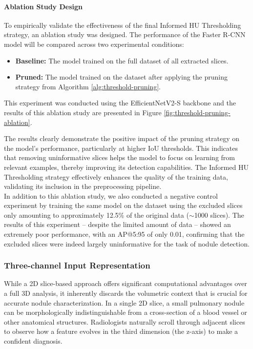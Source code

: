 \paragraph{Ablation Study Design}
To empirically validate the effectiveness of the final Informed HU Thresholding strategy, an ablation study was designed. The performance of the Faster R-CNN model will be compared across two experimental conditions:
\begin{itemize}
    \item \textbf{Baseline:} The model trained on the full dataset of all extracted slices.
    \item \textbf{Pruned:} The model trained on the dataset after applying the pruning strategy from Algorithm \ref{alg:threshold-pruning}.
\end{itemize}
This experiment was conducted using the EfficientNetV2-S backbone and the results of this ablation study are presented in Figure \ref{fig:threshold-pruning-ablation}.



The results clearly demonstrate the positive impact of the pruning strategy on the model's performance, particularly at higher IoU thresholds. This indicates that removing uninformative slices helps the model to focus on learning from relevant examples, thereby improving its detection capabilities. The Informed HU Thresholding strategy effectively enhances the quality of the training data, validating its inclusion in the preprocessing pipeline.\\

In addition to this ablation study, we also conducted a negative control experiment by training the same model on the dataset using the excluded slices only amounting to approximately 12.5\% of the original data ($\sim$1000 slices). The results of this experiment -- despite the limited amount of data -- showed an extremely poor performance, with an AP@5:95 of only 0.01, confirming that the excluded slices were indeed largely uninformative for the task of nodule detection.



\subsubsection{Three-channel Input Representation}
\label{sec:2.5d_approach}

While a 2D slice-based approach offers significant computational advantages over a full 3D analysis, it inherently discards the volumetric context that is crucial for accurate nodule characterization. In a single 2D slice, a small pulmonary nodule can be morphologically indistinguishable from a cross-section of a blood vessel or other anatomical structures. Radiologists naturally scroll through adjacent slices to observe how a feature evolves in the third dimension (the z-axis) to make a confident diagnosis.

